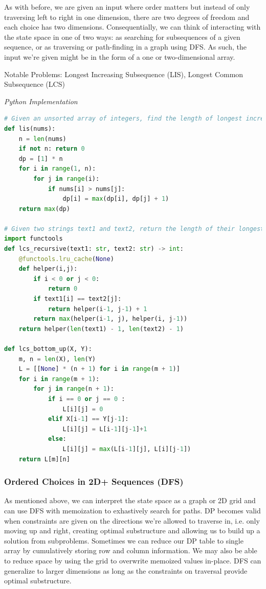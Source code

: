 \documentclass{article}
\newcommand{\comment}[1]{}
\begin{document}
\comment{
Search or Count Subsequences.

Optimize Sortable Compatible Subproblems
- Increased dimensions correspond to job scheduling problems
}
As with before, we are given an input where order matters but instead of only traversing left to right in one dimension, there are two degrees of freedom and each choice has two dimensions. Consequentially, we can think of interacting with the state space in one of two ways: as searching for subsequences of a given sequence, or as traversing or path-finding in a graph using DFS. As such, the input we're given might be in the form of a one or two-dimensional array.  

Notable Problems: Longest Increasing Subsequence (LIS), Longest Common Subsequence (LCS)

\vspace{8pt} \emph{Python Implementation}
\begin{lstlisting}[language=Python]
# Given an unsorted array of integers, find the length of longest increasing subsequence.
def lis(nums):
    n = len(nums)
    if not n: return 0
    dp = [1] * n
    for i in range(1, n):
        for j in range(i):
            if nums[i] > nums[j]:
                dp[i] = max(dp[i], dp[j] + 1)
    return max(dp)

# Given two strings text1 and text2, return the length of their longest common subsequence.
import functools
def lcs_recursive(text1: str, text2: str) -> int:
    @functools.lru_cache(None)
    def helper(i,j):
        if i < 0 or j < 0:
            return 0
        if text1[i] == text2[j]:
            return helper(i-1, j-1) + 1
        return max(helper(i-1, j), helper(i, j-1))
    return helper(len(text1) - 1, len(text2) - 1)

def lcs_bottom_up(X, Y): 
    m, n = len(X), len(Y)
    L = [[None] * (n + 1) for i in range(m + 1)] 
    for i in range(m + 1): 
        for j in range(n + 1): 
            if i == 0 or j == 0 : 
                L[i][j] = 0
            elif X[i-1] == Y[j-1]: 
                L[i][j] = L[i-1][j-1]+1
            else:
                L[i][j] = max(L[i-1][j], L[i][j-1]) 
    return L[m][n] 
\end{lstlisting}

\subsubsection*{Ordered Choices in 2D+ Sequences (DFS)}

As mentioned above, we can interpret the state space as a graph or 2D grid and can use DFS with memoization to exhastively search for paths. DP becomes valid when constraints are given on the directions we're allowed to traverse in, i.e. only moving up and right, creating optimal substructure and allowing us to build up a solution from subproblems. Sometimes we can reduce our DP table to single array by cumulatively storing row and column information. We may also be able to reduce space by using the grid to overwrite memoized values in-place. DFS can generalize to larger dimensions as long as the constraints on traversal provide optimal substructure.
\end{document}
